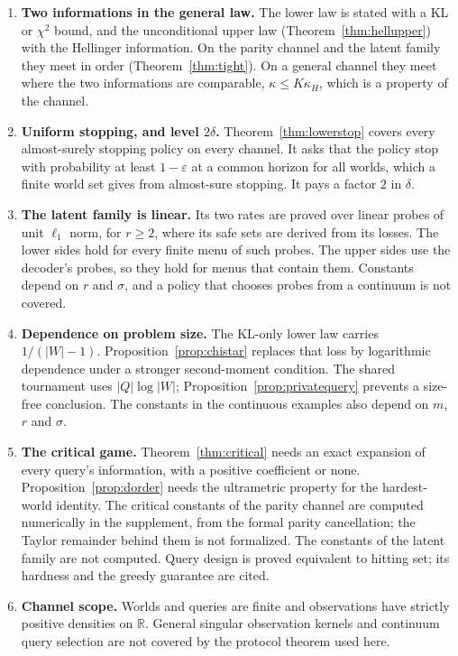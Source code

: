 \begin{enumerate}
\item[1)] \textbf{Two informations in the general law.} The lower law is stated with a KL or
$\chi^{2}$ bound, and the unconditional upper law (Theorem~\ref{thm:hellupper}) with the
Hellinger information. On the parity channel and the latent family they meet in order
(Theorem~\ref{thm:tight}). On a general channel they meet where the two informations are
comparable, $\kappa\le K\kappa_{H}$, which is a property of the channel.
\item[2)] \textbf{Uniform stopping, and level $2\delta$.} Theorem~\ref{thm:lowerstop} covers
every almost-surely stopping policy on every channel. It asks that the policy stop with
probability at least $1-\varepsilon$ at a common horizon for all worlds, which a finite world set
gives from almost-sure stopping. It pays a factor $2$ in $\delta$.
\item[3)] \textbf{The latent family is linear.} Its two rates are proved over linear probes of
unit $\ell_{1}$ norm, for $r\ge2$, where its safe sets are derived from its losses. The lower
sides hold for every finite menu of such probes. The upper sides use the decoder's probes, so
they hold for menus that contain them. Constants depend on $r$ and $\sigma$, and a policy that
chooses probes from a continuum is not covered.
\item[4)] \textbf{Dependence on problem size.} The KL-only lower law carries
$1/(|W|-1)$. Proposition~\ref{prop:chistar} replaces that loss by logarithmic dependence
under a stronger second-moment condition. The shared tournament uses $|Q|\log|W|$;
Proposition~\ref{prop:privatequery} prevents a size-free conclusion. The constants in the
continuous examples also depend on $m$, $r$ and $\sigma$.
\item[5)] \textbf{The critical game.} Theorem~\ref{thm:critical} needs an exact expansion of every
query's information, with a positive coefficient or none. Proposition~\ref{prop:dorder} needs
the ultrametric property for the hardest-world identity. The critical constants of the parity
channel are computed numerically in the supplement, from the formal parity cancellation; the
Taylor remainder behind them is not formalized. The constants of the latent family are not
computed. Query design is proved equivalent to hitting set; its hardness and the greedy
guarantee are cited.
\item[6)] \textbf{Channel scope.} Worlds and queries are finite and observations have strictly
positive densities on $\mathbb R$. General singular observation kernels and continuum query
selection are not covered by the protocol theorem used here.
\end{enumerate}

